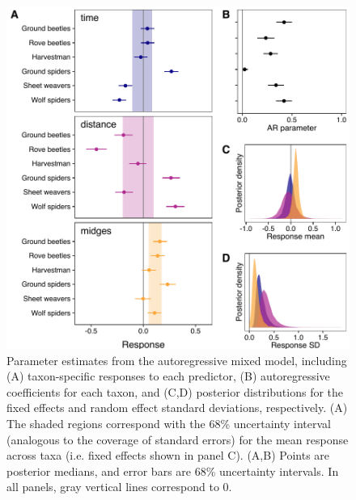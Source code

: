 \documentclass[12pt]{article}
\begin{document}
\begin{figure}
\centering
\includegraphics{fig2.pdf}
\caption{\label{fig:coefs}
Parameter estimates from the autoregressive mixed model, including
(A) taxon-specific responses to each predictor,
(B) autoregressive coefficients for each taxon, and
(C,D) posterior distributions for the fixed effects and random effect standard
deviations, respectively.
(A) The shaded regions correspond with the 68\% uncertainty interval
(analogous to the coverage of standard errors) for the mean response across taxa
(i.e. fixed effects shown in panel C).
(A,B) Points are posterior medians, and error bars are 68\% uncertainty intervals.
In all panels, gray vertical lines correspond to 0.
}
\end{figure}



\clearpage
\end{document}
